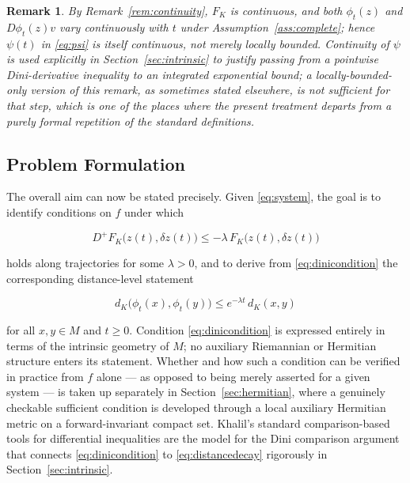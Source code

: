 \documentclass[preprint,12pt,authoryear]{elsarticle}
\newtheorem{remark}{Remark}
\begin{document}
\begin{remark}
By Remark~\ref{rem:continuity}, $F_K$ is continuous, and both $\phi_t(z)$ and $D\phi_t(z)v$ vary continuously with $t$ under Assumption~\ref{ass:complete}; hence $\psi(t)$ in \eqref{eq:psi} is itself continuous, not merely locally bounded. Continuity of $\psi$ is used explicitly in Section~\ref{sec:intrinsic} to justify passing from a pointwise Dini-derivative inequality to an integrated exponential bound; a locally-bounded-only version of this remark, as sometimes stated elsewhere, is not sufficient for that step, which is one of the places where the present treatment departs from a purely formal repetition of the standard definitions.
\end{remark}

\subsection{Problem Formulation}

The overall aim can now be stated precisely. Given \eqref{eq:system}, the goal is to identify conditions on $f$ under which

\begin{equation}
D^+F_K\big(z(t),\delta z(t)\big) \le -\lambda\, F_K\big(z(t),\delta z(t)\big) \label{eq:dinicondition}
\end{equation}

holds along trajectories for some $\lambda>0$, and to derive from \eqref{eq:dinicondition} the corresponding distance-level statement

\begin{equation}
d_K\big(\phi_t(x),\phi_t(y)\big) \le e^{-\lambda t}\, d_K(x,y) \label{eq:distancedecay}
\end{equation}

for all $x,y\in M$ and $t\ge0$. Condition \eqref{eq:dinicondition} is expressed entirely in terms of the intrinsic geometry of $M$; no auxiliary Riemannian or Hermitian structure enters its statement. Whether and how such a condition can be verified in practice from $f$ alone — as opposed to being merely asserted for a given system — is taken up separately in Section~\ref{sec:hermitian}, where a genuinely checkable sufficient condition is developed through a local auxiliary Hermitian metric on a forward-invariant compact set. Khalil's standard comparison-based tools for differential inequalities \cite{khalil2002nonlinear} are the model for the Dini comparison argument that connects \eqref{eq:dinicondition} to \eqref{eq:distancedecay} rigorously in Section~\ref{sec:intrinsic}.
\end{document}
